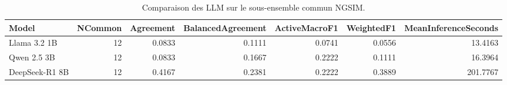 \begin{table}[!htbp]
\caption{Comparaison des LLM sur le sous-ensemble commun NGSIM.}
\label{tab:ngsim_common_llm_metrics}
\begin{tabular}{lrrrrrr}
\toprule
Model & NCommon & Agreement & BalancedAgreement & ActiveMacroF1 & WeightedF1 & MeanInferenceSeconds \\
\midrule
Llama 3.2 1B & 12 & 0.0833 & 0.1111 & 0.0741 & 0.0556 & 13.4163 \\
Qwen 2.5 3B & 12 & 0.0833 & 0.1667 & 0.2222 & 0.1111 & 16.3964 \\
DeepSeek-R1 8B & 12 & 0.4167 & 0.2381 & 0.2222 & 0.3889 & 201.7767 \\
\bottomrule
\end{tabular}
\end{table}
